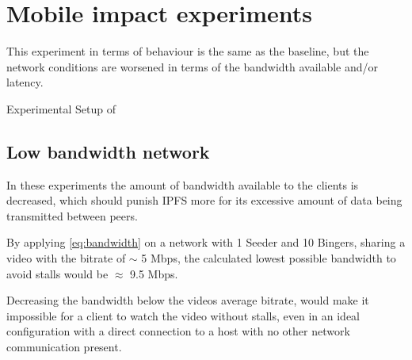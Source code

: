 \if{}

\fi


\FloatBarrier \section{Mobile impact experiments}
\label{sec:eval_mobile}
This experiment in terms of behaviour is the same as the baseline, but the network conditions are worsened  in terms of the bandwidth available and/or latency.

\begin{table}[!htbp]
    \myfloatalign
    \caption[Experimental Setup of Mobile]{Experimental Setup of }
    \label{tab:exp_overview_mobile}
    
\end{table}

\subsection{Low bandwidth network}
\label{sec:eval_low_bandwidth}
In these experiments the amount of bandwidth available to the clients is decreased, which should punish \ac{IPFS} more for its excessive amount of data being transmitted between peers.

By applying \autoref{eq:bandwidth} on a network with 1 Seeder and 10 Bingers, sharing a video with the bitrate of $\sim$ 5 \ac{Mbps}, the calculated lowest possible bandwidth to avoid stalls would be $\approx$ 9.5 \ac{Mbps}.

Decreasing the bandwidth below the videos average bitrate, would make it impossible for a client to watch the video without stalls, even in an ideal configuration with a direct connection to a host with no other network communication present.

